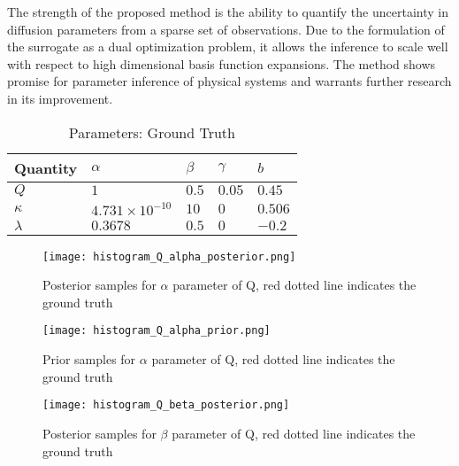 The strength of the proposed method is the ability to quantify the uncertainty in diffusion parameters from a sparse set of observations. Due to the formulation of the surrogate as a dual optimization problem, it allows the inference to scale well with respect to high dimensional basis function expansions. The method shows promise for parameter inference of physical systems and warrants further research in its improvement.


\begin{table}[t]
  \caption{Parameters: Ground Truth}
  \label{tab:ground-truth}
  \centering
  \begin{tabular}{lllll}
    \hline
    \textbf{Quantity}     & $\alpha$     & $\beta$ & $\gamma$ & $b$ \\
    \hline
    $Q$ & $1$  & $0.5$ & $0.05$  & $0.45$     \\
    $\kappa$  & $4.731 \times 10^{-10}$ & $10$  & $0$ & $0.506$ \\
    $\lambda$ & $0.3678$ & $0.5$  & $0$ & $-0.2$ \\
    \hline
  \end{tabular}
\end{table}

\begin{figure}[ht]
\vspace{.3in}
\centerline{\texttt{[image: histogram\_Q\_alpha\_posterior.png]}}
\vspace{.3in}
\caption{Posterior samples for $\alpha$ parameter of Q, red dotted line indicates the ground truth}
\label{fig:alpha}
\end{figure}

\begin{figure}[ht]
\vspace{.3in}
\centerline{\texttt{[image: histogram\_Q\_alpha\_prior.png]}}
\vspace{.3in}
\caption{Prior samples for $\alpha$ parameter of Q, red dotted line indicates the ground truth}
\label{fig:alphaprior}
\end{figure}

\begin{figure}[ht]
\vspace{.3in}
\centerline{\texttt{[image: histogram\_Q\_beta\_posterior.png]}}
\vspace{.3in}
\caption{Posterior samples for $\beta$ parameter of Q, red dotted line indicates the ground truth}
\label{fig:beta}
\end{figure}

